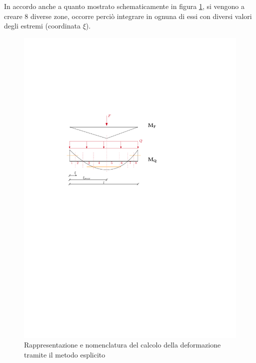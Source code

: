 In accordo anche a quanto mostrato schematicamente in figura \ref{fig:sle_deformazione}, si vengono a creare 8 diverse zone, occorre perciò integrare in ognuna di essi con diversi valori degli estremi (coordinata $\xi$).
\begin{figure}[htb]
    \centering
    \includegraphics[height=0.25\textheight]{IMG/IPE_deformazione.pdf}
    \caption{Rappresentazione e nomenclatura del calcolo della deformazione tramite il metodo esplicito}
    \label{fig:sle_deformazione}
  \end{figure}

